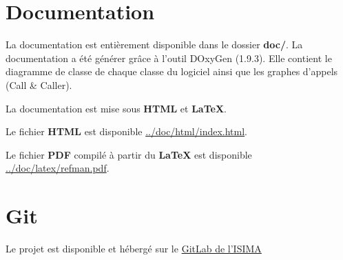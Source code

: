 \documentclass[11pt]{article}
\begin{document}
\section{Documentation\label{orgb4f3b3c}}
\label{sec:org8a26052}

La documentation est entièrement disponible dans le dossier \textbf{doc/}. La
documentation a été générer grâce à l'outil DOxyGen (1.9.3). Elle contient le
diagramme de classe de chaque classe du logiciel ainsi que les graphes
d'appels (Call \& Caller). 

La documentation est mise sous \textbf{HTML} et \textbf{\LaTeX{}}.

Le fichier \textbf{HTML} est disponible \href{/home/hozen/cur/projet-java/doc/html/index.html}{../doc/html/index.html}.

Le fichier \textbf{PDF} compilé à partir du \textbf{\LaTeX{}} est disponible
\href{/home/hozen/cur/projet-java/doc/latex/refman.pdf}{../doc/latex/refman.pdf}.

\section{Git\label{orgb9a795d}}
\label{sec:orgc26e205}

Le projet est disponible et hébergé sur le \href{https://gitlab.isima.fr/endurel/projet-java}{GitLab de l'ISIMA}

\newpage
\listoffigures
\end{document}
